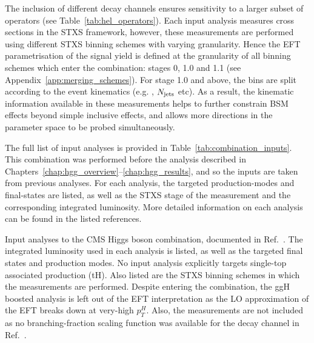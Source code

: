 The inclusion of different decay channels ensures sensitivity to a larger subset of operators (see Table~\ref{tab:hel_operators}). Each input analysis measures cross sections in the STXS framework, however, these measurements are performed using different STXS binning schemes with varying granularity.
Hence the EFT parametrisation of the signal yield is defined at the granularity of all binning schemes which enter the combination: stages 0, 1.0 and 1.1 (see Appendix~\ref{app:merging_schemes}). For stage 1.0 and above, the bins are split according to the event kinematics (e.g. \ptH, $N_{\rm{jets}}$ etc). As a result, the kinematic information available in these measurements helps to further constrain BSM effects beyond simple inclusive effects, and allows more directions in the parameter space to be probed simultaneously.

The full list of input analyses is provided in Table~\ref{tab:combination_inputs}. This combination was performed before the \Hgg analysis described in Chapters~\ref{chap:hgg_overview}--\ref{chap:hgg_results}, and so the \Hgg inputs are taken from previous analyses. For each analysis, the targeted production-modes and final-states are listed, as well as the STXS stage of the measurement and the corresponding integrated luminosity. More detailed information on each analysis can be found in the listed references.

\begin{table}[t]
  \centering
  \footnotesize
  \renewcommand{\arraystretch}{1.5}
  \setlength{\tabcolsep}{2pt}
  \caption[CMS Higgs boson combination input analyses]
  {
    Input analyses to the CMS Higgs boson combination, documented in Ref.~\cite{CMS-PAS-HIG-19-005}. The integrated luminosity used in each analysis is listed, as well as the targeted final states and production modes. No input analysis explicitly targets single-top associated production (tH). Also listed are the STXS binning schemes in which the measurements are performed. Despite entering the combination, the ggH \Hbb boosted analysis is left out of the EFT interpretation as the LO approximation of the EFT breaks down at very-high $p_T^H$. Also, the \Hmumu measurements are not included as no branching-fraction scaling function was available for the \Hmumu decay channel in Ref.~\cite{Hays:2673969}.
  }
  \label{tab:combination_inputs}
  \hspace*{-.7cm}
  
  \hspace*{-.7cm}
\end{table}

